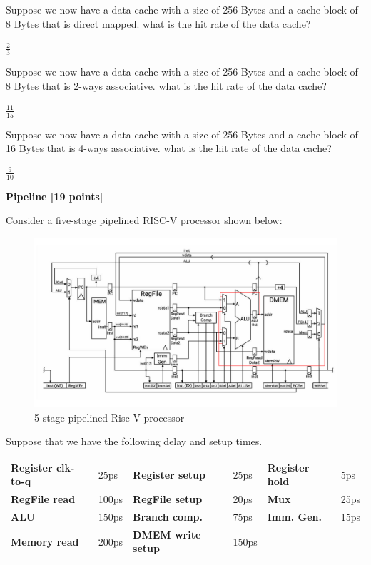 \documentclass[addpoints, 12pt, answers]{exam}
\begin{document}
\begin{questions}
\begin{parts}
        Suppose we now have a data cache with a size of 256 Bytes and a cache block of 8 Bytes that is direct mapped. what is the hit rate of the data cache?


        \underline{$\frac{2}{3}$}

        Suppose we now have a data cache with a size of 256 Bytes and a cache block of 8 Bytes that is 2-ways associative. what is the hit rate of the data cache?


        \underline{$\frac{11}{15}$}


        Suppose we now have a data cache with a size of 256 Bytes and a cache block of 16 Bytes that is 4-ways associative. what is the hit rate of the data cache?

        \underline{$\frac{9}{10}$}




    \end{parts}

    \pagebreak


    \question \textbf{Pipeline [19 points]}

    Consider a five-stage pipelined RISC-V processor shown below:
    \begin{figure}[h]
        \centering
        \includegraphics[width=\linewidth]{pipeline.pdf}
        \caption*{5 stage pipelined Risc-V processor}
        \label{fig:pipelined}
    \end{figure}

    Suppose that we have the following delay and setup times.

    \begin{table}[h]
        \centering
        \begin{tabular}{l l l l l l}
            {\bf Register clk-to-q} & 25ps  & {\bf Register setup}   & 25ps  & {\bf Register hold} & 5ps  \\
            {\bf RegFile read}      & 100ps & {\bf RegFile setup}    & 20ps  & {\bf Mux}           & 25ps \\
            {\bf ALU}               & 150ps & {\bf Branch comp.}     & 75ps  & {\bf Imm. Gen.}     & 15ps \\
            {\bf Memory read}       & 200ps & {\bf DMEM write setup} & 150ps                              \\
        \end{tabular}
        \label{tab:delay_time}
    \end{table}


\end{questions}
\end{document}
